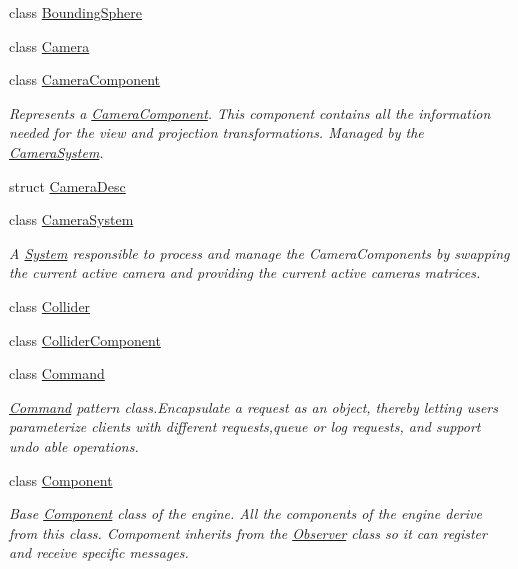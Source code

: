 \begin{DoxyCompactItemize}
class \hyperlink{class_blade_1_1_bounding_sphere}{Bounding\+Sphere}
\item 
class \hyperlink{class_blade_1_1_camera}{Camera}
\item 
class \hyperlink{class_blade_1_1_camera_component}{Camera\+Component}
\begin{DoxyCompactList}\small\item\em Represents a \hyperlink{class_blade_1_1_camera_component}{Camera\+Component}. This component contains all the information needed for the view and projection transformations. Managed by the \hyperlink{class_blade_1_1_camera_system}{Camera\+System}. \end{DoxyCompactList}\item 
struct \hyperlink{struct_blade_1_1_camera_desc}{Camera\+Desc}
\item 
class \hyperlink{class_blade_1_1_camera_system}{Camera\+System}
\begin{DoxyCompactList}\small\item\em A \hyperlink{class_blade_1_1_system}{System} responsible to process and manage the Camera\+Components by swapping the current active camera and providing the current active camera\textquotesingle{}s matrices. \end{DoxyCompactList}\item 
class \hyperlink{class_blade_1_1_collider}{Collider}
\item 
class \hyperlink{class_blade_1_1_collider_component}{Collider\+Component}
\item 
class \hyperlink{class_blade_1_1_command}{Command}
\begin{DoxyCompactList}\small\item\em \hyperlink{class_blade_1_1_command}{Command} pattern class.\+Encapsulate a request as an object, thereby letting users parameterize clients with different requests,queue or log requests, and support undo able operations. \end{DoxyCompactList}\item 
class \hyperlink{class_blade_1_1_component}{Component}
\begin{DoxyCompactList}\small\item\em Base \hyperlink{class_blade_1_1_component}{Component} class of the engine. All the components of the engine derive from this class. Compoment inherits from the \hyperlink{class_blade_1_1_observer}{Observer} class so it can register and receive specific messages. \end{DoxyCompactList}\item 

\end{DoxyCompactItemize}
